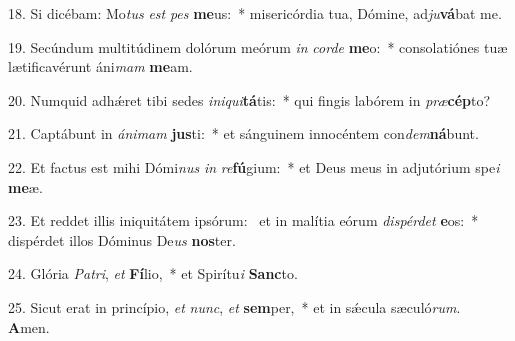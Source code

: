 18. Si dicébam: Mo\textit{tus} \textit{est} \textit{pes} \textbf{me}us:~*  misericórdia tua, Dómine, ad\textit{ju}\textbf{vá}bat me.\

19. Secúndum multitúdinem dolórum meórum \textit{in} \textit{cor}\textit{de} \textbf{me}o:~*  consolatiónes tuæ lætificavérunt áni\textit{mam} \textbf{me}am.\

20. Numquid adhǽret tibi sedes \textit{in}\textit{i}\textit{qui}\textbf{tá}tis:~*  qui fingis labórem in \textit{præ}\textbf{cép}to?\

21. Captábunt in \textit{á}\textit{ni}\textit{mam} \textbf{jus}ti:~*  et sánguinem innocéntem con\textit{dem}\textbf{ná}bunt.\

22. Et factus est mihi Dómi\textit{nus} \textit{in} \textit{re}\textbf{fú}gium:~*  et Deus meus in adjutórium spe\textit{i} \textbf{me}æ.\

23. Et reddet illis iniquitátem ipsórum: \dag\  et in malítia eórum \textit{dis}\textit{pér}\textit{det} \textbf{e}os:~*  dispérdet illos Dóminus De\textit{us} \textbf{nos}ter.\

24. Glória \textit{Pa}\textit{tri}, \textit{et} \textbf{Fí}lio,~*  et Spirítu\textit{i} \textbf{Sanc}to.\

25. Sicut erat in princípio, \textit{et} \textit{nunc}, \textit{et} \textbf{sem}per,~*  et in sǽcula sæculó\textit{rum}. \textbf{A}men.\

